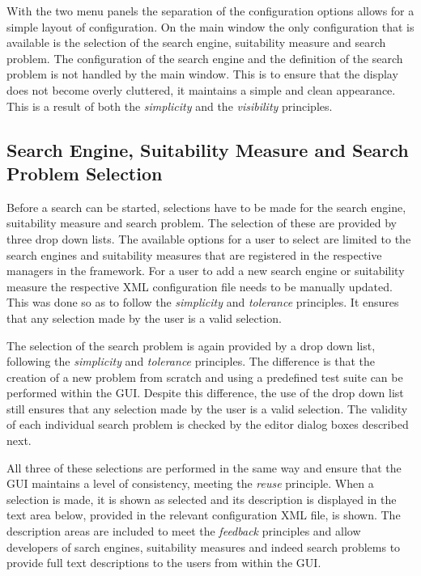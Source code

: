 With the two menu panels the separation of the configuration options allows for a simple layout of configuration.
On the main window the only configuration that is available is the selection of the search engine, suitability measure and search problem.
The configuration of the search engine and the definition of the search problem is not handled by the main window.
This is to ensure that the display does not become overly cluttered, it maintains a simple and clean appearance.
This is a result of both the \emph{simplicity} and the \emph{visibility} principles.

\subsection{Search Engine, Suitability Measure and Search Problem Selection}
\label{sec:seselecdes}
\label{sec:smselecdes}
\label{sec:spselecdes}
Before a search can be started, selections have to be made for the search engine, suitability measure and search problem.
The selection of these are provided by three drop down lists.
The available options for a user to select are limited to the search engines and suitability measures that are registered in the respective managers in the framework.
For a user to add a new search engine or suitability measure the respective XML configuration file needs to be manually updated.
This was done so as to follow the \emph{simplicity} and \emph{tolerance} principles.
It ensures that any selection made by the user is a valid selection.

The selection of the search problem is again provided by a drop down list, following the \emph{simplicity} and \emph{tolerance} principles.
The difference is that the creation of a new problem from scratch and using a predefined test suite can be performed within the GUI.
Despite this difference, the use of the drop down list still ensures that any selection made by the user is a valid selection.
The validity of each individual search problem is checked by the editor dialog boxes described next.

All three of these selections are performed in the same way and ensure that the GUI maintains a level of consistency, meeting the \emph{reuse} principle.
When a selection is made, it is shown as selected and its description is displayed in the text area below, provided in the relevant configuration XML file, is shown.
The description areas are included to meet the \emph{feedback} principles and allow developers of sarch engines, suitability measures and indeed search problems to provide full text descriptions to the users from within the GUI.

